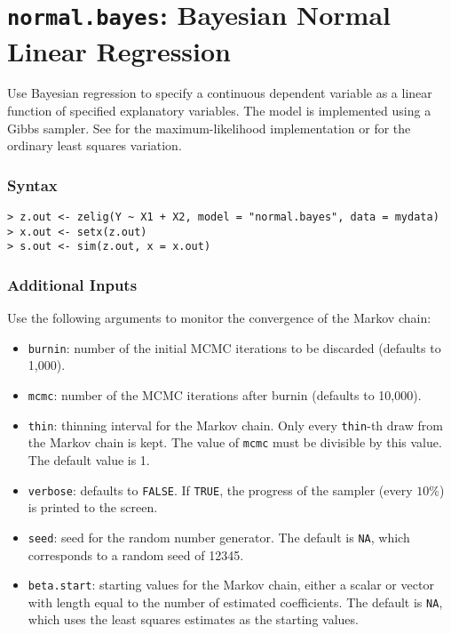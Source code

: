 \section{\texttt{normal.bayes}: Bayesian Normal Linear Regression}
\label{normal.bayes}

Use Bayesian regression to specify a continuous dependent variable as
a linear function of specified explanatory variables.  The model is
implemented using a Gibbs sampler.  See  for the
maximum-likelihood implementation or  for the ordinary least
squares variation.

\subsubsection{Syntax}
\begin{verbatim}
> z.out <- zelig(Y ~ X1 + X2, model = "normal.bayes", data = mydata)
> x.out <- setx(z.out)
> s.out <- sim(z.out, x = x.out)
\end{verbatim}

\subsubsection{Additional Inputs}

Use the following arguments to monitor the convergence of the Markov
chain:  
\begin{itemize}
\item \texttt{burnin}: number of the initial MCMC iterations to be 
 discarded (defaults to 1,000).

\item \texttt{mcmc}: number of the MCMC iterations after burnin
(defaults to 10,000).

\item \texttt{thin}: thinning interval for the Markov chain. Only every 
 \texttt{thin}-th draw from the Markov chain is kept. The value of 
\texttt{mcmc} must be divisible by this value. The default value is 1.

\item \texttt{verbose}: defaults to {\tt FALSE}. If \texttt{TRUE}, the
progress of the sampler (every $10\%$) is printed to the screen.

\item \texttt{seed}: seed for the random number generator. The default
is \texttt{NA}, which corresponds to a random seed of 12345.

\item \texttt{beta.start}: starting values for the Markov 
chain, either a scalar or vector with length equal to the number 
of estimated coefficients. The default is \texttt{NA}, which uses the
least squares estimates as the starting values. 

\end{itemize}

